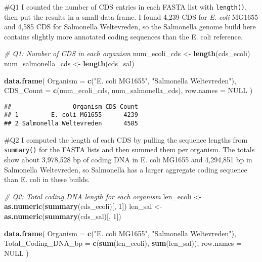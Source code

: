 \documentclass[
]{article}
\newenvironment{Shaded}{\begin{snugshade}}{\end{snugshade}}
\newcommand{\AttributeTok}[1]{\textcolor[rgb]{0.13,0.29,0.53}{#1}}
\newcommand{\CommentTok}[1]{\textcolor[rgb]{0.56,0.35,0.01}{\textit{#1}}}
\newcommand{\ConstantTok}[1]{\textcolor[rgb]{0.56,0.35,0.01}{#1}}
\newcommand{\DecValTok}[1]{\textcolor[rgb]{0.00,0.00,0.81}{#1}}
\newcommand{\FunctionTok}[1]{\textcolor[rgb]{0.13,0.29,0.53}{\textbf{#1}}}
\newcommand{\NormalTok}[1]{#1}
\newcommand{\OtherTok}[1]{\textcolor[rgb]{0.56,0.35,0.01}{#1}}
\newcommand{\StringTok}[1]{\textcolor[rgb]{0.31,0.60,0.02}{#1}}
\begin{document}
\#Q1 I counted the number of CDS entries in each FASTA list with
\texttt{length()}, then put the results in a small data frame. I found
4,239 CDS for \emph{E. coli} MG1655 and 4,585 CDS for Salmonella
Weltevreden, so the Salmonella genome build here contains slightly more
annotated coding sequences than the E. coli reference.

\begin{Shaded}
\begin{Highlighting}[]
\CommentTok{\# Q1: Number of CDS in each organism }
\NormalTok{num\_ecoli\_cds }\OtherTok{\textless{}{-}} \FunctionTok{length}\NormalTok{(cds\_ecoli)}
\NormalTok{num\_salmonella\_cds }\OtherTok{\textless{}{-}} \FunctionTok{length}\NormalTok{(cds\_sal)}

\FunctionTok{data.frame}\NormalTok{(}
  \AttributeTok{Organism =} \FunctionTok{c}\NormalTok{(}\StringTok{"E. coli MG1655"}\NormalTok{, }\StringTok{"Salmonella Weltevreden"}\NormalTok{),}
  \AttributeTok{CDS\_Count =} \FunctionTok{c}\NormalTok{(num\_ecoli\_cds, num\_salmonella\_cds),}
  \AttributeTok{row.names =} \ConstantTok{NULL}
\NormalTok{)}
\end{Highlighting}
\end{Shaded}

\begin{verbatim}
##                 Organism CDS_Count
## 1         E. coli MG1655      4239
## 2 Salmonella Weltevreden      4585
\end{verbatim}

\#Q2 I computed the length of each CDS by pulling the sequence lengths
from \texttt{summary()} for the FASTA lists and then summed them per
organism. The totals show about 3,978,528 bp of coding DNA in E. coli
MG1655 and 4,294,851 bp in Salmonella Weltevreden, so Salmonella has a
larger aggregate coding sequence than E. coli in these builds.

\begin{Shaded}
\begin{Highlighting}[]
\CommentTok{\# Q2: Total coding DNA length for each organism  }
\NormalTok{len\_ecoli }\OtherTok{\textless{}{-}} \FunctionTok{as.numeric}\NormalTok{(}\FunctionTok{summary}\NormalTok{(cds\_ecoli)[, }\DecValTok{1}\NormalTok{])}
\NormalTok{len\_sal   }\OtherTok{\textless{}{-}} \FunctionTok{as.numeric}\NormalTok{(}\FunctionTok{summary}\NormalTok{(cds\_sal)[, }\DecValTok{1}\NormalTok{])}

\FunctionTok{data.frame}\NormalTok{(}
  \AttributeTok{Organism =} \FunctionTok{c}\NormalTok{(}\StringTok{"E. coli MG1655"}\NormalTok{, }\StringTok{"Salmonella Weltevreden"}\NormalTok{),}
  \AttributeTok{Total\_Coding\_DNA\_bp =} \FunctionTok{c}\NormalTok{(}\FunctionTok{sum}\NormalTok{(len\_ecoli), }\FunctionTok{sum}\NormalTok{(len\_sal)),}
  \AttributeTok{row.names =} \ConstantTok{NULL}
\NormalTok{)}
\end{Highlighting}
\end{Shaded}
\end{document}
